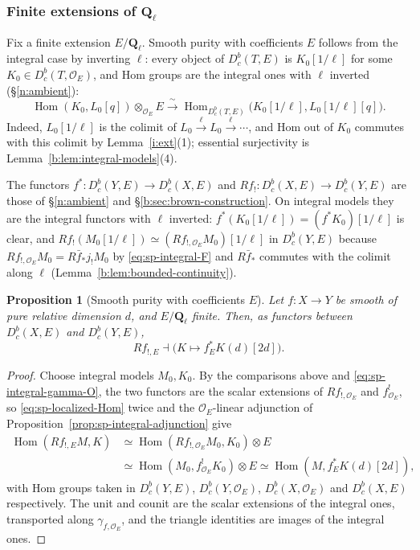 \documentclass[11pt,a4paper]{article}
\numberwithin{equation}{section}
\newtheorem{proposition}[theorem]{Proposition}
\theoremstyle{definition}
\theoremstyle{remark}
\newcommand{\Dbc}{D^b_c}
\newcommand{\Ql}{\mathbf Q_\ell}
\newcommand{\Hom}{\operatorname{Hom}}
\begin{document}
\subsubsection{Finite extensions of $\Ql$}

Fix a finite extension $E/\Ql$. Smooth purity with coefficients $E$
follows from the integral case by inverting $\ell$: every object of $\Dbc(T,E)$ is $K_0[1/\ell]$ for some
$K_0\in\Dbc(T,\mathcal O_E)$, and Hom groups are the integral ones with
$\ell$ inverted (\S\ref{n:ambient}):
\begin{equation}\label{eq:sp-localized-Hom}
 \Hom(K_0,L_0[q])\otimes_{\mathcal O_E}E
 \xrightarrow{\ \sim\ }
 \Hom_{\Dbc(T,E)}\bigl(K_0[1/\ell],L_0[1/\ell][q]\bigr).
\end{equation}
Indeed, $L_0[1/\ell]$ is the colimit of $L_0\xrightarrow{\ell}L_0\xrightarrow{\ell}\cdots$,
and Hom out of $K_0$ commutes with this colimit by
Lemma~\ref{i:ext}(1); essential surjectivity is
Lemma~\ref{b:lem:integral-models}(4).

The functors $f^*\colon\Dbc(Y,E)\to\Dbc(X,E)$ and
$Rf_!\colon\Dbc(X,E)\to\Dbc(Y,E)$ are those of
\S\ref{n:ambient} and \S\ref{b:sec:brown-construction}. On integral models
they are the integral functors with $\ell$ inverted:
$f^*(K_0[1/\ell])=(f^*K_0)[1/\ell]$ is clear, and
$Rf_!(M_0[1/\ell])\simeq(Rf_{!,\mathcal O_E}M_0)[1/\ell]$ in $\Dbc(Y,E)$ because
$Rf_{!,\mathcal O_E}M_0=R\bar f_*j_!M_0$ by \eqref{eq:sp-integral-F} and
$R\bar f_*$ commutes with the colimit along $\ell$
(Lemma~\ref{b:lem:bounded-continuity}).

\begin{proposition}[Smooth purity with coefficients $E$]
\label{cor:sp-rational}
Let $f:X\to Y$ be smooth of pure relative dimension $d$, and $E/\Ql$
finite. Then, as functors between $\Dbc(X,E)$ and $\Dbc(Y,E)$,
\[
 Rf_{!,E}\dashv\bigl(K\longmapsto f_E^*K(d)[2d]\bigr).
\]
\end{proposition}
\begin{proof}
Choose integral models $M_0,K_0$. By the comparisons above and
\eqref{eq:sp-integral-gamma-O}, the two functors are the scalar
extensions of $Rf_{!,\mathcal O_E}$ and $f^!_{\mathcal O_E}$, so
\eqref{eq:sp-localized-Hom} twice and the $\mathcal O_E$-linear
adjunction of Proposition~\ref{prop:sp-integral-adjunction} give
\[
 \begin{aligned}
 \operatorname{Hom}(Rf_{!,E}M,K)
 &\simeq\operatorname{Hom}(Rf_{!,\mathcal O_E}M_0,K_0)\otimes E\\
 &\simeq\operatorname{Hom}(M_0,f_{\mathcal O_E}^!K_0)\otimes E
 \simeq\operatorname{Hom}(M,f_E^*K(d)[2d]),
 \end{aligned}
\]
with Hom groups taken in $\Dbc(Y,E)$, $\Dbc(Y,\mathcal O_E)$,
$\Dbc(X,\mathcal O_E)$ and $\Dbc(X,E)$ respectively. The unit and counit are the scalar extensions of the integral ones,
transported along $\gamma_{f,\mathcal O_E}$, and the triangle identities
are images of the integral ones.
\end{proof}
\end{document}
